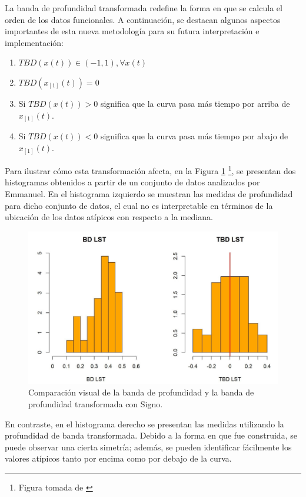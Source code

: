 La banda de profundidad transformada redefine la forma en que se calcula el orden de los datos funcionales. A continuación, se destacan algunos aspectos importantes de esta nueva metodología para su futura interpretación e implementación:

\begin{enumerate}
    \item $TBD(x(t)) \in (-1, 1), \forall x(t)$
    \item $TBD(x_{[1]}(t)) = 0$
    \item Si $TBD(x(t)) > 0$ significa que la curva pasa más tiempo por arriba de $x_{[1]}(t)$.
    \item Si $TBD(x(t)) < 0$ significa que la curva pasa más tiempo por abajo de $x_{[1]}(t)$.
\end{enumerate}

Para ilustrar cómo esta transformación afecta, en la Figura \ref{fig:ComparaBandas} \footnote{Figura tomada de \cite{BandaEmanuel}}, se presentan dos histogramas obtenidos a partir de un conjunto de datos analizados por Emmanuel. En el histograma izquierdo se muestran las medidas de profundidad para dicho conjunto de datos, el cual no es interpretable en términos de la ubicación de los datos atípicos con respecto a la mediana.

\begin{figure}[H]
    \centering
    \includegraphics[width = 0.7 \textwidth]{Imagenes/comparacionBandas.png}
    \caption{Comparación visual de la banda de profundidad y la banda de profundidad transformada con Signo.}
    \label{fig:ComparaBandas}
\end{figure}

En contraste, en el histograma derecho se presentan las medidas utilizando la profundidad de banda transformada. Debido a la forma en que fue construida, se puede observar una cierta simetría; además, se pueden identificar fácilmente los valores atípicos tanto por encima como por debajo de la curva.

